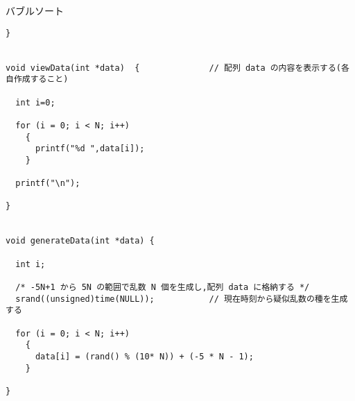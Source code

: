 \documentclass[a4j,titlepage]{jarticle}
\begin{document}
\begin{breakitembox}[l]{バブルソート}
\begin{verbatim}
}


void viewData(int *data)  {              // 配列 data の内容を表示する(各自作成すること)
  
  int i=0;
  
  for (i = 0; i < N; i++)
    {
      printf("%d ",data[i]);
    }
  
  printf("\n");

}


void generateData(int *data) {

  int i; 
  
  /* -5N+1 から 5N の範囲で乱数 N 個を生成し,配列 data に格納する */
  srand((unsigned)time(NULL));           // 現在時刻から疑似乱数の種を生成する
  
  for (i = 0; i < N; i++)
    {
      data[i] = (rand() % (10* N)) + (-5 * N - 1);
    }

}
\end{verbatim}
\end{breakitembox}
\end{document}
